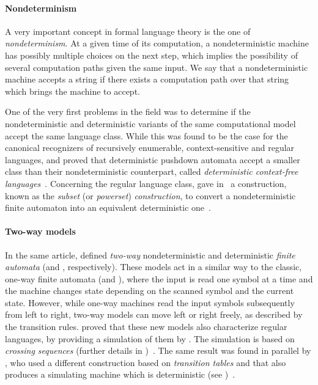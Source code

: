 \paragraph{Nondeterminism} A very important concept in formal language theory is the one of \emph{nondeterminism}.
At a given time of its computation, a nondeterministic machine has possibly multiple choices on the next step, which implies the possibility of several computation paths given the same input.
We say that a nondeterministic machine accepts a string if there exists a computation path over that string which brings the machine to accept.

One of the very first problems in the field was to determine if the nondeterministic and deterministic variants of the same computational model accept the same language class.
While this was found to be the case for the canonical recognizers of recursively enumerable, context-sensitive and regular languages, \citeauthor{Fis63} and \citeauthor{Sch63} proved that deterministic pushdown automata accept a smaller class than their nondeterministic counterpart, called \emph{deterministic context-free languages}~\cite{Fis63,Sch63}.
Concerning the regular language class, \citeauthor{RabSco59} gave in~\citeyear{RabSco59} a construction, known as the \emph{subset} (or \emph{powerset}) \emph{construction}, to convert a nondeterministic finite automaton into an equivalent deterministic one~\cite{RabSco59}.

\paragraph{Two-way models} In the same article, \citeauthor{RabSco59} defined \emph{two-way} nondeterministic and deterministic \emph{finite automata} (\TNFAs and \TDFAs, respectively).
These models act in a similar way to the classic, one-way finite automata (\ONFAs and \ODFAs), where the input is read one symbol at a time and the machine changes state depending on the scanned symbol and the current state. However, while one-way machines read the input symbols subsequently from left to right, two-way models can move left or right freely, as described by the transition rules.
\citeauthor{RabSco59} proved that these new models also characterize regular languages, by providing a simulation of them by \ONFAs. The simulation is based on \emph{crossing sequences} (further details in )~\cite{RabSco59}.
The same result was found in parallel by \citeauthor{She59}, who used a different construction based on \emph{transition tables} and that also produces a simulating machine which is deterministic (see )~\cite{She59}.



